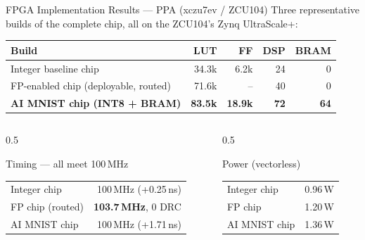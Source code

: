 \documentclass[aspectratio=169,11pt]{beamer}
\newcommand{\hl}[1]{{\color{simtixaccent}\textbf{#1}}}
\begin{document}
\begin{frame}{FPGA Implementation Results --- PPA (xczu7ev / ZCU104)}
  Three representative builds of the complete chip, all on the ZCU104's Zynq UltraScale+:
  \vspace{0.3em}
  \begin{center}\small
  \begin{tabular}{@{}lrrrr@{}}
    \toprule
    Build & LUT & FF & DSP & BRAM \\
    \midrule
    Integer baseline chip            & 34.3k & 6.2k  & 24 & 0 \\
    FP-enabled chip (deployable, routed) & 71.6k & --   & 40 & 0 \\
    \textbf{AI MNIST chip (INT8 + BRAM)} & \textbf{83.5k} & \textbf{18.9k} & \textbf{72} & \textbf{64} \\
    \bottomrule
  \end{tabular}
  \end{center}
  \vspace{0.4em}
  \begin{columns}[T]
    \begin{column}{0.5\textwidth}
      \begin{block}{Timing --- all meet 100\,MHz}
        \small
        \begin{tabular}{@{}lr@{}}
          Integer chip     & 100\,MHz (+0.25\,ns) \\
          FP chip (routed)  & \hl{103.7\,MHz}, 0 DRC \\
          AI MNIST chip     & 100\,MHz (+1.71\,ns) \\
        \end{tabular}
      \end{block}
    \end{column}
    \begin{column}{0.5\textwidth}
      \begin{block}{Power (vectorless)}
        \small
        \begin{tabular}{@{}lr@{}}
          Integer chip  & 0.96\,W \\
          FP chip       & 1.20\,W \\
          AI MNIST chip & 1.36\,W \\
        \end{tabular}
      \end{block}
    \end{column}
  \end{columns}
\end{frame}
\end{document}
